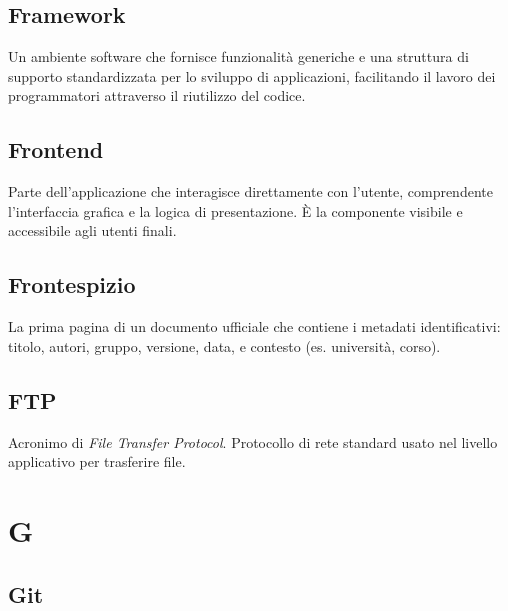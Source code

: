 \documentclass[a4paper, 11pt, oneside]{scrartcl} %
\begin{document}
\subsection*{Framework}
Un ambiente software che fornisce funzionalità generiche e una struttura di supporto standardizzata per lo sviluppo di applicazioni, facilitando il lavoro dei programmatori attraverso il riutilizzo del codice.
\vspace{0.5cm}

\subsection*{Frontend}


Parte dell'applicazione che interagisce direttamente con l'utente, comprendente l'interfaccia grafica e la logica di presentazione. È la componente visibile e accessibile agli utenti finali.

\vspace{0.5cm}

\subsection*{Frontespizio}


La prima pagina di un documento ufficiale che contiene i metadati identificativi: titolo, autori, gruppo, versione, data, e contesto (es. università, corso).

\vspace{0.5cm}

\subsection*{FTP}
Acronimo di \textit{File Transfer Protocol}. Protocollo di rete standard usato nel livello applicativo per trasferire file.
\vspace{0.5cm}



\section*{G}


\subsection*{Git}
\end{document}
